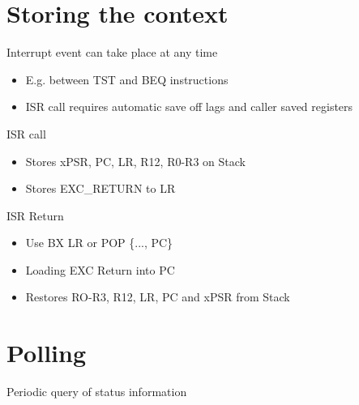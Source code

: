 \documentclass[10pt]{article}
\begin{document}
\section*{Storing the context}
Interrupt event can take place at any time

\begin{itemize}
  \item E.g. between TST and BEQ instructions
  \item ISR call requires automatic save off lags and caller saved registers
\end{itemize}

ISR call

\begin{itemize}
  \item Stores xPSR, PC, LR, R12, R0-R3 on Stack
  \item Stores EXC\_RETURN to LR
\end{itemize}

ISR Return

\begin{itemize}
  \item Use BX LR or POP \{..., PC\}
  \item Loading EXC Return into PC
  \item Restores RO-R3, R12, LR, PC and xPSR from Stack
\end{itemize}

\section*{Polling}
Periodic query of status information
\end{document}
